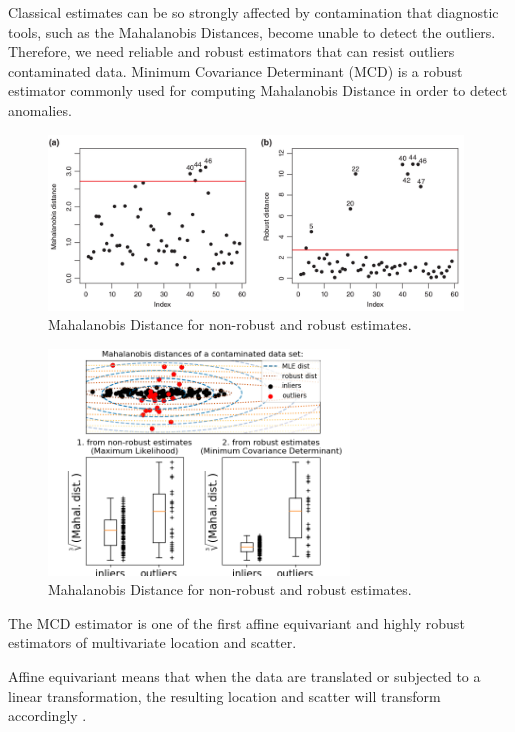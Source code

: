 \documentclass[review]{elsarticle}
\begin{document}
Classical estimates can be so strongly affected by contamination that diagnostic tools, such as the Mahalanobis Distances, become unable to detect the outliers. Therefore, we need reliable and robust estimators that can resist outliers contaminated data. Minimum Covariance Determinant (MCD) \cite{rousseeuw1984mcd} is a robust estimator commonly used for computing Mahalanobis Distance in order to detect anomalies.

\begin{figure}[h!]
     \centering
     \includegraphics[width=11cm]{figures/mahalanobis_robust.png}
     \caption{Mahalanobis Distance for non-robust and robust estimates.}
     \label{fig:fig04}
\end{figure}

\begin{figure}[h!]
     \centering
     \includegraphics[width=8cm]{figures/mahalanobis_distances01.png}
     \caption{Mahalanobis Distance for non-robust and robust estimates.}
     \label{fig:fig05}
\end{figure}

The MCD estimator is one of the first affine equivariant and highly robust estimators of multivariate location and scatter.
		
Affine equivariant means that when the data are translated or subjected to a linear transformation, the resulting location and scatter will transform accordingly \cite{rousseeuw1984mcd,rousseeuw1999fastmcd}.
\end{document}
